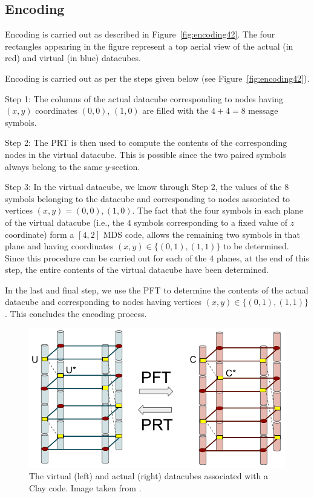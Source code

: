 \begin{multicols}{2}
 \subsection{Encoding} 
 Encoding is carried out as described in Figure~\ref{fig:encoding42}.   The four rectangles appearing in the figure represent a top aerial view of the actual (in red) and virtual (in blue) datacubes.

 Encoding is carried out as per the steps given below (see Figure~\ref{fig:encoding42}).
 \bit
 \item Step 1: The columns of the actual datacube corresponding to nodes having $(x,y)$ coordinates $(0,0)$, $(1,0)$ are filled with the $4+4=8$ message symbols.  
 \item Step 2: The PRT is then used to compute the contents of the corresponding nodes in the virtual datacube. This is possible since the two paired symbols always belong to the same $y$-section. 
 \item Step 3: In the virtual datacube, we know through Step 2, the values of the $8$ symbols belonging to the datacube and corresponding to nodes associated to vertices $(x,y)=(0,0),(1,0)$. The fact that the four symbols in each plane of the virtual datacube (i.e., the $4$ symbols corresponding to a fixed value of $z$ coordinate) form a $[4,2]$ MDS code, allows the remaining two symbols in that plane and having coordinates $(x,y) \in \{(0,1),(1,1)\}$ to be determined. 	Since this procedure can be carried out for each of the $4$ planes, at the end of this step, the entire contents of the virtual datacube have been determined. 
 \item In the last and final step, we use the PFT to determine the contents of the actual datacube and corresponding to nodes having vertices $(x,y) \in \{(0,1),(1,1)\}$.  This concludes the encoding process. 
 \eit
 \end{multicols}
 
  	
 
 	\begin{figure}[h!]
 		\centering
 		\includegraphics[scale=.58]{src/Figures/chap4/actVirtCubes42}  
 		\caption{The virtual (left) and actual (right) datacubes associated with a Clay code.  Image taken from \cite{VajhaFAST18}. }  \label{fig:actVirtCubes42}    
 	\end{figure}

